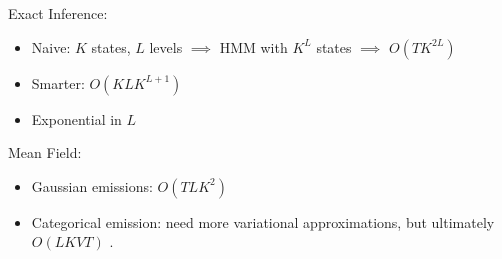 \begin{frame}

Exact Inference: \\
\begin{itemize}
\item Naive: $K$ states, $L$ levels $\implies$ HMM with $K^L$ states $\implies$  $O(TK^{2L})$ 
    \item Smarter: $O(KLK^{L+1})$
    \item Exponential in $L$
\end{itemize}
\air
\pause 
Mean Field: \\
\begin{itemize}
    \item Gaussian emissions: $O(TLK^2)$ 
    \item Categorical emission: need more variational approximations, but ultimately $O(LKVT)$ \citep{nepal2013}.
\end{itemize}
\end{frame}







